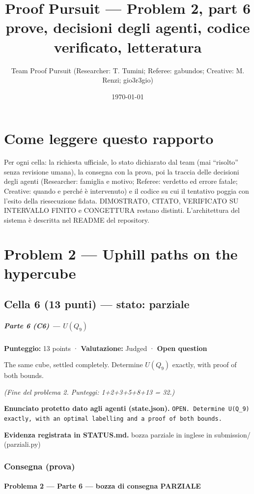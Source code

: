 \documentclass[11pt,a4paper]{article}
\title{Proof Pursuit --- Problem 2, part 6\\ \large prove, decisioni degli agenti, codice verificato, letteratura}
\author{Team Proof Pursuit (Researcher: T. Tumini; Referee: gabundos; Creative: M. Renzi; gio3r3gio)}
\date{\today}
\begin{document}
\maketitle\tableofcontents
\section*{Come leggere questo rapporto}
Per ogni cella: la richiesta ufficiale, lo stato dichiarato dal team (mai ``risolto'' senza revisione umana), la consegna
con la prova, poi la traccia delle decisioni degli agenti (Researcher: famiglia e motivo; Referee: verdetto ed errore
fatale; Creative: quando e perché è intervenuto) e il codice su cui il tentativo poggia con l'esito della riesecuzione
fidata. DIMOSTRATO, CITATO, VERIFICATO SU INTERVALLO FINITO e CONGETTURA restano distinti. L'architettura del sistema
è descritta nel README del repository.
\section{Problem 2 — Uphill paths on the hypercube}
\subsection{Cella 6 (13 punti) — stato: parziale}
\subparagraph{\texorpdfstring{Parte 6 (C6) ---
\(U(Q_9)\)}{Parte 6 (C6) --- U(Q\_9)}}\label{parte-6-c6-uq_9}

\textbf{Punteggio:} 13 points · \textbf{Valutazione:} Judged ·
\textbf{Open question}

The same cube, settled completely. Determine \(U(Q_9)\) exactly, with
proof of both bounds.

\emph{(Fine del problema 2. Punteggi: 1+2+3+5+8+13 = 32.)}

\textbf{Enunciato protetto dato agli agenti (state.json).} \texttt{OPEN. Determine U(Q\_9) exactly, with an optimal labelling and a proof of both bounds.}

\textbf{Evidenza registrata in STATUS.md.} bozza parziale in inglese in submission/ (parziali.py)

\subsubsection{Consegna (prova)}
\paragraph{Problema 2 --- Parte 6 --- bozza di consegna
PARZIALE}\label{problema-2-parte-6-bozza-di-consegna-parziale}
\end{document}
